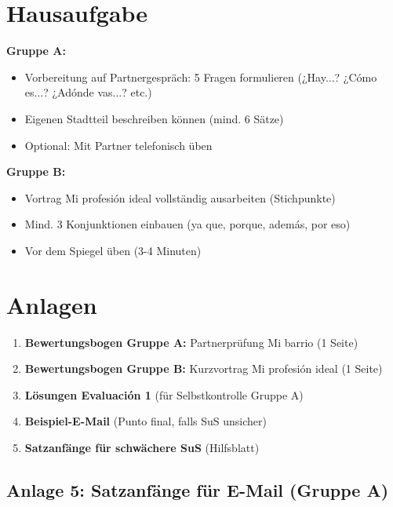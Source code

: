 \documentclass[11pt, a4paper]{article}
\begin{document}
\section{Hausaufgabe}

\textbf{Gruppe A:}
\begin{itemize}[leftmargin=2em]
    \item Vorbereitung auf Partnergespräch: 5 Fragen formulieren (¿Hay...? ¿Cómo es...? ¿Adónde vas...? etc.)
    \item Eigenen Stadtteil beschreiben können (mind. 6 Sätze)
    \item Optional: Mit Partner telefonisch üben
\end{itemize}

\textbf{Gruppe B:}
\begin{itemize}[leftmargin=2em]
    \item Vortrag \glqq{}Mi profesión ideal\grqq{} vollständig ausarbeiten (Stichpunkte)
    \item Mind. 3 Konjunktionen einbauen (ya que, porque, además, por eso)
    \item Vor dem Spiegel üben (3-4 Minuten)
\end{itemize}


\section{Anlagen}

\begin{enumerate}[leftmargin=2em]
    \item \textbf{Bewertungsbogen Gruppe A:} Partnerprüfung \glqq{}Mi barrio\grqq{} (1 Seite)
    \item \textbf{Bewertungsbogen Gruppe B:} Kurzvortrag \glqq{}Mi profesión ideal\grqq{} (1 Seite)
    \item \textbf{Lösungen Evaluación 1} (für Selbstkontrolle Gruppe A)
    \item \textbf{Beispiel-E-Mail} (Punto final, falls SuS unsicher)
    \item \textbf{Satzanfänge für schwächere SuS} (Hilfsblatt)
\end{enumerate}

\subsection*{Anlage 5: Satzanfänge für E-Mail (Gruppe A)}
\end{document}
